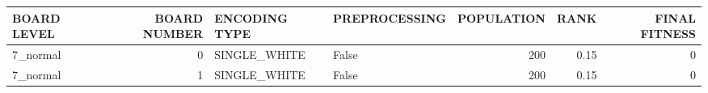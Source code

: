 \begin{tabular}{lrllrrr}
\hline
 BOARD LEVEL   &   BOARD NUMBER & ENCODING TYPE   & PREPROCESSING   &   POPULATION &   RANK &   FINAL FITNESS \\
\hline
 7\_normal      &              0 & SINGLE\_WHITE    & False           &          200 &   0.15 &               0 \\
 7\_normal      &              1 & SINGLE\_WHITE    & False           &          200 &   0.15 &               0 \\
\hline
\end{tabular}